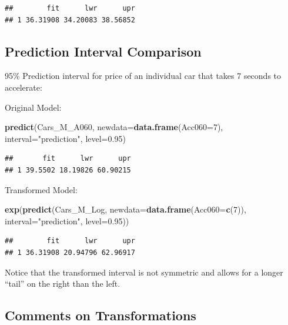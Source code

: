 \documentclass[]{book}
\newenvironment{Shaded}{\begin{snugshade}}{\end{snugshade}}
\newcommand{\KeywordTok}[1]{\textcolor[rgb]{0.13,0.29,0.53}{\textbf{#1}}}
\newcommand{\DataTypeTok}[1]{\textcolor[rgb]{0.13,0.29,0.53}{#1}}
\newcommand{\DecValTok}[1]{\textcolor[rgb]{0.00,0.00,0.81}{#1}}
\newcommand{\FloatTok}[1]{\textcolor[rgb]{0.00,0.00,0.81}{#1}}
\newcommand{\StringTok}[1]{\textcolor[rgb]{0.31,0.60,0.02}{#1}}
\newcommand{\NormalTok}[1]{#1}
\begin{document}
\begin{verbatim}
##        fit      lwr      upr
## 1 36.31908 34.20083 38.56852
\end{verbatim}

\subsection{Prediction Interval
Comparison}\label{prediction-interval-comparison}

95\% Prediction interval for price of an individual car that takes 7
seconds to accelerate:

Original Model:

\begin{Shaded}
\begin{Highlighting}[]
\KeywordTok{predict}\NormalTok{(Cars_M_A060, }\DataTypeTok{newdata=}\KeywordTok{data.frame}\NormalTok{(}\DataTypeTok{Acc060=}\DecValTok{7}\NormalTok{), }\DataTypeTok{interval=}\StringTok{"prediction"}\NormalTok{, }\DataTypeTok{level=}\FloatTok{0.95}\NormalTok{)}
\end{Highlighting}
\end{Shaded}

\begin{verbatim}
##       fit      lwr      upr
## 1 39.5502 18.19826 60.90215
\end{verbatim}

Transformed Model:

\begin{Shaded}
\begin{Highlighting}[]
\KeywordTok{exp}\NormalTok{(}\KeywordTok{predict}\NormalTok{(Cars_M_Log, }\DataTypeTok{newdata=}\KeywordTok{data.frame}\NormalTok{(}\DataTypeTok{Acc060=}\KeywordTok{c}\NormalTok{(}\DecValTok{7}\NormalTok{)), }\DataTypeTok{interval=}\StringTok{"prediction"}\NormalTok{, }\DataTypeTok{level=}\FloatTok{0.95}\NormalTok{))}
\end{Highlighting}
\end{Shaded}

\begin{verbatim}
##        fit      lwr      upr
## 1 36.31908 20.94796 62.96917
\end{verbatim}

Notice that the transformed interval is not symmetric and allows for a
longer ``tail'' on the right than the left.

\subsection{Comments on
Transformations}\label{comments-on-transformations}
\end{document}
